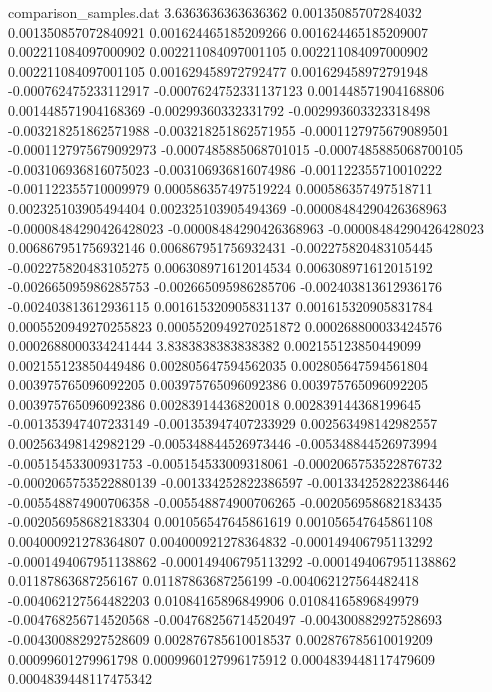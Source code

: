 \begin{filecontents}{comparison_samples.dat}
3.6363636363636362  0.00135085707284032     0.001350857072840921    0.001624465185209266   0.001624465185209007   0.002211084097000902   0.002211084097001105   0.002211084097000902   0.002211084097001105   0.001629458972792477   0.001629458972791948   -0.000762475233112917   -0.0007624752331137123  0.001448571904168806   0.001448571904168369   -0.00299360332331792    -0.002993603323318498   -0.003218251862571988   -0.003218251862571955   -0.0001127975679089501  -0.0001127975679092973  -0.0007485885068701015  -0.0007485885068700105  -0.003106936816075023   -0.003106936816074986   -0.001122355710010222   -0.001122355710009979   0.000586357497519224   0.000586357497518711   0.002325103905494404   0.002325103905494369   -0.00008484290426368963 -0.00008484290426428023 -0.00008484290426368963 -0.00008484290426428023 0.006867951756932146   0.006867951756932431   -0.002275820483105445   -0.002275820483105275   0.006308971612014534   0.006308971612015192   -0.002665095986285753   -0.002665095986285706   -0.002403813612936176   -0.002403813612936115   0.001615320905831137   0.001615320905831784   0.0005520949270255823  0.0005520949270251872  0.000268800033424576    0.0002688000334241444 
3.8383838383838382  0.002155123850449099    0.002155123850449486    0.002805647594562035   0.002805647594561804   0.003975765096092205   0.003975765096092386   0.003975765096092205   0.003975765096092386   0.00283914436820018    0.002839144368199645   -0.001353947407233149   -0.001353947407233929   0.002563498142982557   0.002563498142982129   -0.005348844526973446   -0.005348844526973994   -0.00515453300931753    -0.005154533009318061   -0.0002065753522876732  -0.0002065753522880139  -0.001334252822386597   -0.001334252822386446   -0.005548874900706358   -0.005548874900706265   -0.002056958682183435   -0.002056958682183304   0.001056547645861619   0.001056547645861108   0.004000921278364807   0.004000921278364832   -0.000149406795113292   -0.0001494067951138862  -0.000149406795113292   -0.0001494067951138862  0.01187863687256167    0.01187863687256199    -0.004062127564482418   -0.004062127564482203   0.01084165896849906    0.01084165896849979    -0.004768256714520568   -0.004768256714520497   -0.004300882927528693   -0.004300882927528609   0.002876785610018537   0.002876785610019209   0.00099601279961798    0.0009960127996175912  0.0004839448117479609   0.0004839448117475342 

\end{filecontents}
